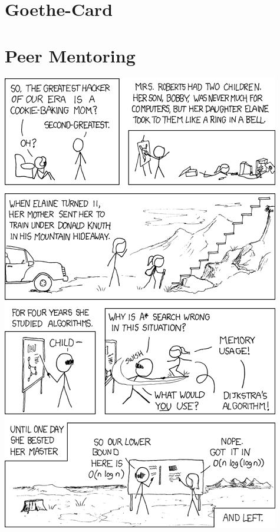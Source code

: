 \documentclass[a4paper,12pt]{scrartcl}
\newcommand{\spaltenanfang}{\begin{multicols}{2}}
\newcommand{\spaltenende}{\end{multicols}}
\begin{document}

\newpage
\section{Goethe-Card}






\newpage
\section{Peer Mentoring}

\spaltenanfang

\spaltenende


\begin{center}
	\includegraphics[scale=0.88]{comics/1337_part_2}
\end{center}
\end{document}
